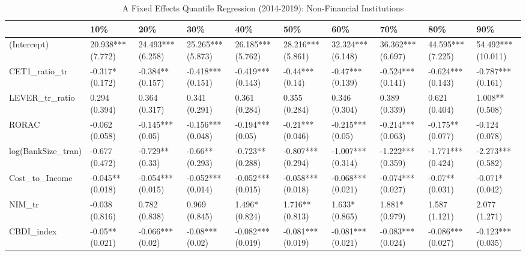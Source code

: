 \begin{table}[ht]
\centering
\caption{A Fixed Effects Quantile Regression (2014-2019): Non-Financial Institutions} 
\begingroup\small
\begin{tabular}{llllllllll}
  \toprule
 & 10\% & 20\% & 30\% & 40\% & 50\% & 60\% & 70\% & 80\% & 90\% \\ 
  \midrule
(Intercept) & 20.938*** (7.772) & 24.493*** (6.258) & 25.265*** (5.873) & 26.185*** (5.762) & 28.216*** (5.861) & 32.324*** (6.148) & 36.362*** (6.697) & 44.595*** (7.225) & 54.492*** (10.011) \\ 
  CET1\_ratio\_tr & -0.317* (0.172) & -0.384** (0.157) & -0.418*** (0.151) & -0.419*** (0.143) & -0.44*** (0.14) & -0.47*** (0.139) & -0.524*** (0.141) & -0.624*** (0.143) & -0.787*** (0.161) \\ 
  LEVER\_tr\_ratio & 0.294 (0.394) & 0.364 (0.317) & 0.341 (0.291) & 0.361 (0.284) & 0.355 (0.284) & 0.346 (0.304) & 0.389 (0.339) & 0.621 (0.404) & 1.008** (0.508) \\ 
  RORAC & -0.062 (0.058) & -0.145*** (0.05) & -0.156*** (0.048) & -0.194*** (0.05) & -0.21*** (0.046) & -0.215*** (0.05) & -0.214*** (0.063) & -0.175** (0.077) & -0.124 (0.078) \\ 
  log(BankSize\_tran) & -0.677 (0.472) & -0.729** (0.33) & -0.66** (0.293) & -0.723** (0.288) & -0.807*** (0.294) & -1.007*** (0.314) & -1.222*** (0.359) & -1.771*** (0.424) & -2.273*** (0.582) \\ 
  Cost\_to\_Income & -0.045** (0.018) & -0.054*** (0.015) & -0.052*** (0.014) & -0.052*** (0.015) & -0.058*** (0.018) & -0.068*** (0.021) & -0.074*** (0.027) & -0.07** (0.031) & -0.071* (0.042) \\ 
  NIM\_tr & -0.038 (0.816) & 0.782 (0.838) & 0.969 (0.845) & 1.496* (0.824) & 1.716** (0.813) & 1.633* (0.865) & 1.881* (0.979) & 1.587 (1.121) & 2.077 (1.271) \\ 
  CBDI\_index & -0.05** (0.021) & -0.066*** (0.02) & -0.08*** (0.02) & -0.082*** (0.019) & -0.081*** (0.019) & -0.081*** (0.021) & -0.083*** (0.024) & -0.086*** (0.027) & -0.123*** (0.035) \\ 
   \bottomrule
\end{tabular}
\endgroup
\end{table}
